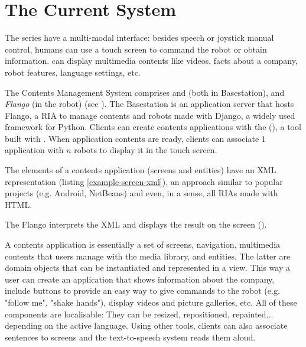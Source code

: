 \section{The Current System}
The  series have a multi-modal interface: besides speech or joystick manual control, humans can use a touch screen to command the robot or obtain information.
 can display multimedia contents like videos, facts about a company, robot features, language settings, etc.

The Contents Management System comprises \emph{\flangofe} and \emph{\flangobe} (both in Basestation), and \emph{Flango \cm} (in the robot) (see ).
The Basestation is an application server that hosts Flango, a \ac{RIA} to manage contents and robots made with Django, a widely used framework for Python. 
Clients can create contents applications  with the \flangofe (\se), a tool built with \flash .
When application contents are ready, clients can associate $1$ application with $n$ robots to display it in the touch screen.



The elements of a contents application (screens and entities) have an \ac{XML} representation (listing \ref{example-screen-xml}), an approach similar to popular projects (e.g. Android, NetBeans) and even, in a sense, all \acp{RIA} made with \ac{HTML}.

The Flango \cm interprets the \ac{XML} and displays the result on the screen ().

A contents application is essentially a set of screens, navigation, multimedia contents that users manage with the media library, and entities. 
The latter are domain objects that can be instantiated and represented in a view. 
This way a user can create an application that shows information about the company, include buttons to provide an easy way to give commands to the robot (e.g. "follow me", "shake hands"), display videos and picture galleries, etc.
All of these components are localisable:  
They can be resized, repositioned, repainted... depending on the active language.
Using other tools, clients can also associate sentences to screens and the text-to-speech system reads them aloud.

